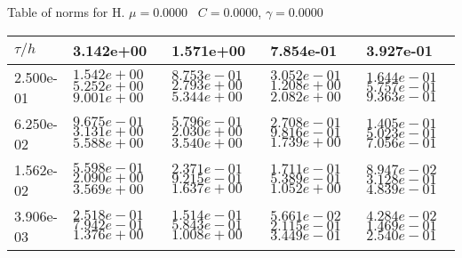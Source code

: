 \begin{center}
Table of norms for H. $\mu = 0.0000$ \, $C = 0.0000$, $\gamma = 0.0000$
  
\begin{tabular}{|p{1in}|p{1in}|p{1in}|p{1in}|p{1in}|} \hline
$\tau / h$ &3.142e+00 &1.571e+00 &7.854e-01 &3.927e-01 \\ \hline 
2.500e-01 & $1.542e+00$  $5.252e+00$  $9.001e+00$  & $8.753e-01$  $2.793e+00$  $5.344e+00$  & $3.052e-01$  $1.208e+00$  $2.082e+00$  & $1.644e-01$  $5.757e-01$  $9.363e-01$  \\ \hline 
6.250e-02 & $9.675e-01$  $3.131e+00$  $5.588e+00$  & $5.796e-01$  $2.030e+00$  $3.540e+00$  & $2.708e-01$  $9.816e-01$  $1.739e+00$  & $1.405e-01$  $5.023e-01$  $7.056e-01$  \\ \hline 
1.562e-02 & $5.598e-01$  $2.090e+00$  $3.569e+00$  & $2.371e-01$  $9.215e-01$  $1.637e+00$  & $1.711e-01$  $5.389e-01$  $1.052e+00$  & $8.947e-02$  $3.128e-01$  $4.839e-01$  \\ \hline 
3.906e-03 & $2.518e-01$  $7.942e-01$  $1.376e+00$  & $1.514e-01$  $5.843e-01$  $1.008e+00$  & $5.661e-02$  $2.115e-01$  $3.449e-01$  & $4.284e-02$  $1.469e-01$  $2.540e-01$  \\ \hline 

\end{tabular}\\[20pt]
\end{center}
